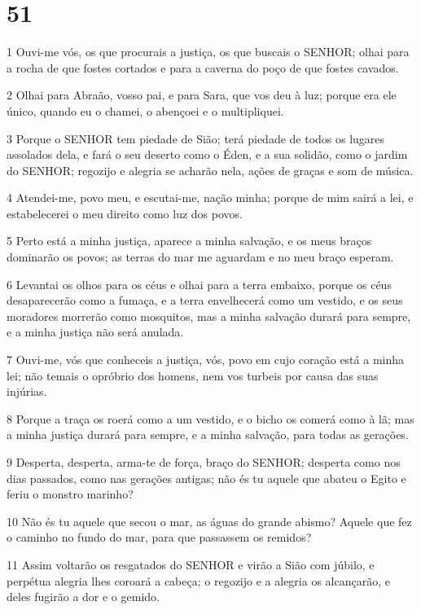 \chapter{51}

\par 1 Ouvi-me vós, os que procurais a justiça, os que buscais o SENHOR; olhai para a rocha de que fostes cortados e para a caverna do poço de que fostes cavados.
\par 2 Olhai para Abraão, vosso pai, e para Sara, que vos deu à luz; porque era ele único, quando eu o chamei, o abençoei e o multipliquei.
\par 3 Porque o SENHOR tem piedade de Sião; terá piedade de todos os lugares assolados dela, e fará o seu deserto como o Éden, e a sua solidão, como o jardim do SENHOR; regozijo e alegria se acharão nela, ações de graças e som de música.
\par 4 Atendei-me, povo meu, e escutai-me, nação minha; porque de mim sairá a lei, e estabelecerei o meu direito como luz dos povos.
\par 5 Perto está a minha justiça, aparece a minha salvação, e os meus braços dominarão os povos; as terras do mar me aguardam e no meu braço esperam.
\par 6 Levantai os olhos para os céus e olhai para a terra embaixo, porque os céus desaparecerão como a fumaça, e a terra envelhecerá como um vestido, e os seus moradores morrerão como mosquitos, mas a minha salvação durará para sempre, e a minha justiça não será anulada.
\par 7 Ouvi-me, vós que conheceis a justiça, vós, povo em cujo coração está a minha lei; não temais o opróbrio dos homens, nem vos turbeis por causa das suas injúrias.
\par 8 Porque a traça os roerá como a um vestido, e o bicho os comerá como à lã; mas a minha justiça durará para sempre, e a minha salvação, para todas as gerações.
\par 9 Desperta, desperta, arma-te de força, braço do SENHOR; desperta como nos dias passados, como nas gerações antigas; não és tu aquele que abateu o Egito e feriu o monstro marinho?
\par 10 Não és tu aquele que secou o mar, as águas do grande abismo? Aquele que fez o caminho no fundo do mar, para que passassem os remidos?
\par 11 Assim voltarão os resgatados do SENHOR e virão a Sião com júbilo, e perpétua alegria lhes coroará a cabeça; o regozijo e a alegria os alcançarão, e deles fugirão a dor e o gemido.
